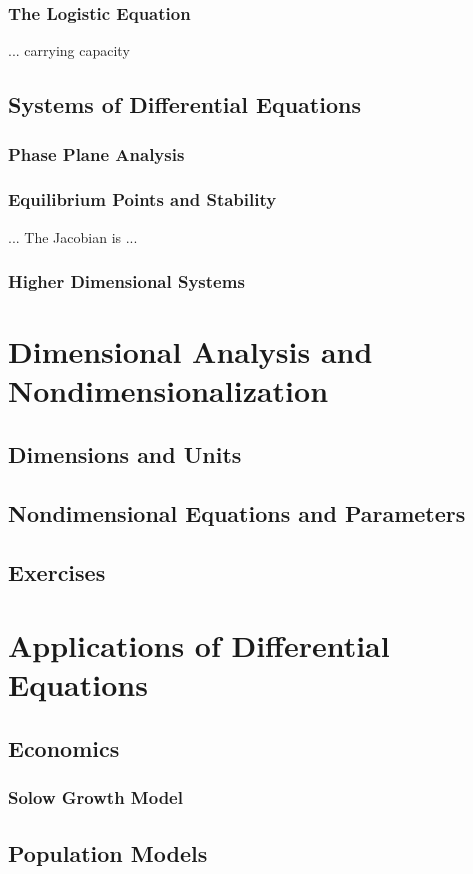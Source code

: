 \documentclass{book}
\begin{document}
\subsection{The Logistic Equation}
... carrying capacity
\section{Systems of Differential Equations}
\subsection{Phase Plane Analysis}
\subsection{Equilibrium Points and Stability}
... The Jacobian is ...
\subsection{Higher Dimensional Systems}
%
\chapter[Dimensional Analysis]{Dimensional Analysis and Nondimensionalization}
\section{Dimensions and Units}
\section{Nondimensional Equations and Parameters}
\section{Exercises}
%
\chapter{Applications of Differential Equations}
\section{Economics}
\subsection{Solow Growth Model}
\section{Population Models}
\end{document}
